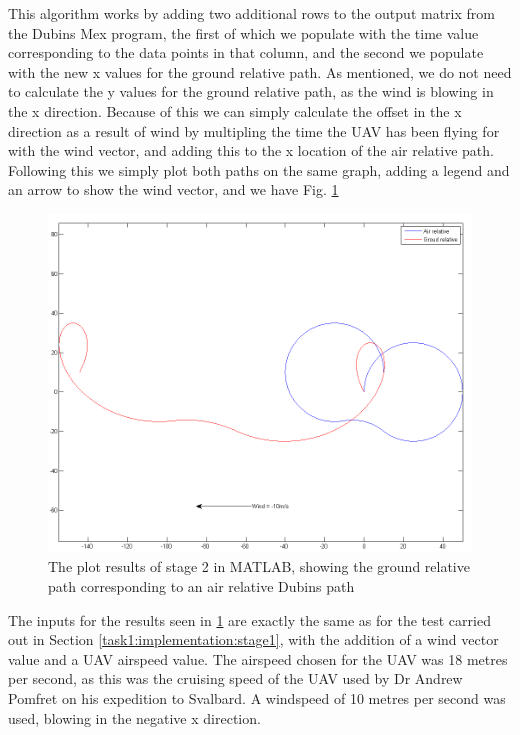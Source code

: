 This algorithm works by adding two additional rows to the output matrix from the Dubins Mex program, the first of which we populate with the time value corresponding to the data points in that column, and the second we populate with the new x values for the ground relative path. As mentioned, we do not need to calculate the y values for the ground relative path, as the wind is blowing in the x direction. Because of this we can simply calculate the offset in the x direction as a result of wind by multipling the time the UAV has been flying for with the wind vector, and adding this to the x location of the air relative path. Following this we simply plot both paths on the same graph, adding a legend and an arrow to show the wind vector, and we have Fig. \ref{fig:pp2demo}

\begin{figure}[htbp!] 
\centering    
\includegraphics[width=\textwidth]{PP2_Demo}
\caption[stage 2: Plotting the Effects of Wind on Dubins Paths in MATLAB]{The plot results of stage 2 in MATLAB, showing the ground relative path corresponding to an air relative Dubins path}
\label{fig:pp2demo}
\end{figure}

The inputs for the results seen in \ref{fig:pp2demo} are exactly the same as for the test carried out in Section \ref{task1:implementation:stage1}, with the addition of a wind vector value and a UAV airspeed value. The airspeed chosen for the UAV was 18 metres per second, as this was the cruising speed of the UAV used by Dr Andrew Pomfret on his expedition to Svalbard. A windspeed of 10 metres per second was used, blowing in the negative x direction.

